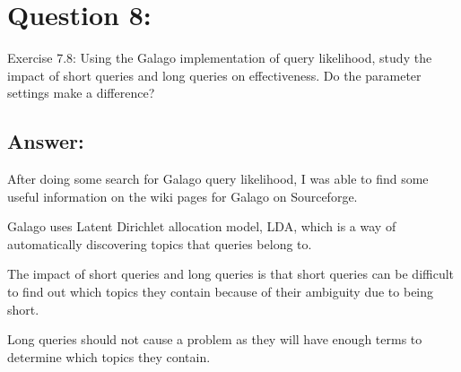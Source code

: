 \section*{Question 8:}
Exercise 7.8: Using the Galago implementation of query likelihood, study the impact of short queries and long queries on effectiveness. Do the parameter settings make a difference?

\subsection*{Answer:}

After doing some search for Galago query likelihood, I was able to find some useful information on the wiki pages for Galago on Sourceforge.

Galago uses Latent Dirichlet allocation model, LDA, which is a way of automatically discovering topics that queries belong to. 

The impact of short queries and long queries is that short queries can be difficult to find out which topics they contain because of their ambiguity due to being short.

Long queries should not cause a problem as they will have enough terms to determine which topics they contain.
